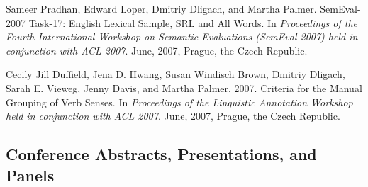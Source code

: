 \documentclass[letterpaper]{article}
\renewenvironment{itemize}{
  \begin{list}{}{
    \setlength{\leftmargin}{1.5em}
  }
}{
  \end{list}
}
\begin{document}
\begin{itemize}
\item Sameer Pradhan, Edward Loper, Dmitriy Dligach, and Martha Palmer. SemEval-2007 Task-17: English Lexical Sample, SRL and All Words. In \emph {Proceedings of the Fourth International Workshop on Semantic Evaluations (SemEval-2007) held in conjunction with ACL-2007}. June, 2007, Prague, the Czech Republic.
\item Cecily Jill Duffield, Jena D. Hwang, Susan Windisch Brown, Dmitriy Dligach, Sarah E. Vieweg, Jenny Davis, and Martha Palmer. 2007. Criteria for the Manual Grouping of Verb Senses. In \emph {Proceedings of the Linguistic Annotation Workshop held in conjunction with ACL 2007}. June, 2007, Prague, the Czech Republic.
\end{itemize}

\subsection*{Conference Abstracts, Presentations, and Panels}
\end{document}
